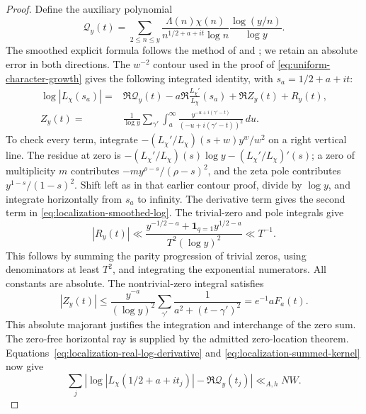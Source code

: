 \begin{proof}
Define the auxiliary polynomial
\[
 \mathcal Q_y(t)=\sum_{2\le n\le y}
 \frac{\Lambda(n)\chi(n)}{n^{1/2+a+it}\log n}
                       \frac{\log(y/n)}{\log y}.
\]
The smoothed explicit formula follows the method of
\cite[Lemma~1 and its integrated form, pp.~985--987]{soundararajan-moments2009}
and \cite[equations~(2.2)--(2.6), pp.~111--112]{sono-dirichlet2013};
we retain an absolute error in both directions.
The $w^{-2}$ contour used in the proof of
\eqref{eq:uniform-character-growth} gives the following integrated
identity, with $s_a=1/2+a+it$:
\begin{align}
 \log|L_\chi(s_a)|
 ={}&\Re\mathcal Q_y(t)
       -a\Re\frac{L_\chi'}{L_\chi}(s_a)+\Re Z_y(t)+R_y(t),
       \label{eq:localization-smoothed-log}\\
 Z_y(t)={}&\frac1{\log y}\sum_{\gamma'}\int_a^\infty
 \frac{y^{-u+i(\gamma'-t)}}{(-u+i(\gamma'-t))^2}\,du.
 \nonumber
\end{align}
To check every term, integrate
$-(L_\chi'/L_\chi)(s+w)y^w/w^2$ on a right vertical line.
The residue at zero is
$-(L_\chi'/L_\chi)(s)\log y-(L_\chi'/L_\chi)'(s)$;
a zero of multiplicity $m$ contributes
$-m y^{\rho-s}/(\rho-s)^2$, and the zeta pole contributes
$y^{1-s}/(1-s)^2$. Shift left as in that earlier contour proof,
divide by $\log y$, and integrate horizontally from $s_a$ to
infinity. The derivative term gives the second term in
\eqref{eq:localization-smoothed-log}. The trivial-zero and pole
integrals give
\[
 |R_y(t)|\ll
 \frac{y^{-1/2-a}+\mathbf1_{q=1}y^{1/2-a}}
                 {T^2(\log y)^2}\ll T^{-1}.
\]
This follows by summing the parity progression of trivial zeros,
using denominators at least $T^2$, and integrating the exponential
numerators. All constants are absolute. The nontrivial-zero integral
satisfies
\[
 |Z_y(t)|\le
 \frac{y^{-a}}{(\log y)^2}
       \sum_{\gamma'}\frac1{a^2+(t-\gamma')^2}
             =e^{-1}aF_a(t).
\]
This absolute majorant justifies the integration and interchange of
the zero sum. The zero-free horizontal ray is supplied by the
admitted zero-location theorem.
Equations~\eqref{eq:localization-real-log-derivative} and
\eqref{eq:localization-summed-kernel} now give
\begin{equation}\label{eq:localization-auxiliary-log-mean}
 \sum_j\left|\log|L_\chi(1/2+a+it_j)|
                      -\Re\mathcal Q_y(t_j)\right|
                      \ll_{A,h}NW.
\end{equation}


\end{proof}

